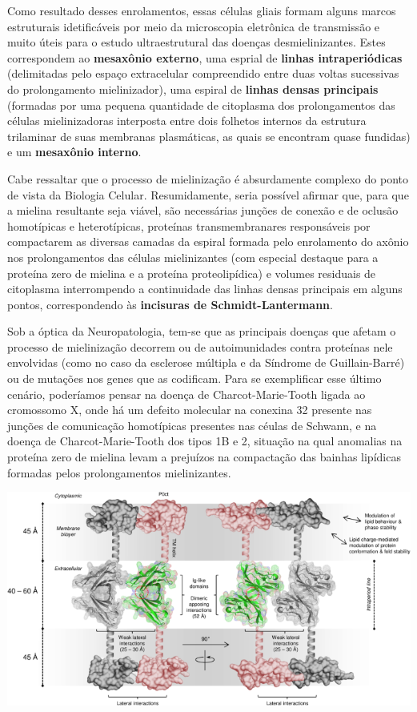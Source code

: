 \documentclass[
]{book}
\begin{document}
Como resultado desses enrolamentos, essas células gliais formam alguns marcos estruturais idetificáveis por meio da microscopia eletrônica de transmissão e muito úteis para o estudo ultraestrutural das doenças desmielinizantes. Estes correspondem ao \textbf{mesaxônio externo}, uma esprial de \textbf{linhas intraperiódicas} (delimitadas pelo espaço extracelular compreendido entre duas voltas sucessivas do prolongamento mielinizador), uma espiral de \textbf{linhas densas principais} (formadas por uma pequena quantidade de citoplasma dos prolongamentos das células mielinizadoras interposta entre dois folhetos internos da estrutura trilaminar de suas membranas plasmáticas, as quais se encontram quase fundidas) e um \textbf{mesaxônio interno}.

Cabe ressaltar que o processo de mielinização é absurdamente complexo do ponto de vista da Biologia Celular. Resumidamente, seria possível afirmar que, para que a mielina resultante seja viável, são necessárias junções de conexão e de oclusão homotípicas e heterotípicas, proteínas transmembranares responsáveis por compactarem as diversas camadas da espiral formada pelo enrolamento do axônio nos prolongamentos das células mielinizantes (com especial destaque para a proteína zero de mielina e a proteína proteolipídica) e volumes residuais de citoplasma interrompendo a continuidade das linhas densas principais em alguns pontos, correspondendo às \textbf{incisuras de Schmidt-Lantermann}.

Sob a óptica da Neuropatologia, tem-se que as principais doenças que afetam o processo de mielinização decorrem ou de autoimunidades contra proteínas nele envolvidas (como no caso da esclerose múltipla e da Síndrome de Guillain-Barré) ou de mutações nos genes que as codificam. Para se exemplificar esse último cenário, poderíamos pensar na doença de Charcot-Marie-Tooth ligada ao cromossomo X, onde há um defeito molecular na conexina 32 presente nas junções de comunicação homotípicas presentes nas céulas de Schwann, e na doença de Charcot-Marie-Tooth dos tipos 1B e 2, situação na qual anomalias na proteína zero de mielina levam a prejuízos na compactação das bainhas lipídicas formadas pelos prolongamentos mielinizantes.

\includegraphics{images/neuro-p0myelin.png}
\end{document}
